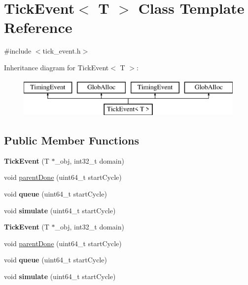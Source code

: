 \hypertarget{classTickEvent}{\section{Tick\-Event$<$ T $>$ Class Template Reference}
\label{classTickEvent}
}


{\ttfamily \#include $<$tick\-\_\-event.\-h$>$}

Inheritance diagram for Tick\-Event$<$ T $>$\-:\begin{figure}[H]
\begin{center}
\leavevmode
\includegraphics[height=2.000000cm]{classTickEvent}
\end{center}
\end{figure}
\subsection*{Public Member Functions}
\begin{DoxyCompactItemize}
\item 
\hypertarget{classTickEvent_ab6621bb33df2dd1e13cb3af454c60414}{{\bfseries Tick\-Event} (T $\ast$\-\_\-obj, int32\-\_\-t domain)}\label{classTickEvent_ab6621bb33df2dd1e13cb3af454c60414}

\item 
void \hyperlink{classTickEvent_ab044a76691e38747e8a1a4106910fcab}{parent\-Done} (uint64\-\_\-t start\-Cycle)
\item 
\hypertarget{classTickEvent_a0adf11e849f6ea0a173d317ea3b60945}{void {\bfseries queue} (uint64\-\_\-t start\-Cycle)}\label{classTickEvent_a0adf11e849f6ea0a173d317ea3b60945}

\item 
\hypertarget{classTickEvent_abc514f421a56a13407269b6ecef4396b}{void {\bfseries simulate} (uint64\-\_\-t start\-Cycle)}\label{classTickEvent_abc514f421a56a13407269b6ecef4396b}

\item 
\hypertarget{classTickEvent_ab6621bb33df2dd1e13cb3af454c60414}{{\bfseries Tick\-Event} (T $\ast$\-\_\-obj, int32\-\_\-t domain)}\label{classTickEvent_ab6621bb33df2dd1e13cb3af454c60414}

\item 
void \hyperlink{classTickEvent_ab044a76691e38747e8a1a4106910fcab}{parent\-Done} (uint64\-\_\-t start\-Cycle)
\item 
\hypertarget{classTickEvent_a0adf11e849f6ea0a173d317ea3b60945}{void {\bfseries queue} (uint64\-\_\-t start\-Cycle)}\label{classTickEvent_a0adf11e849f6ea0a173d317ea3b60945}

\item 
\hypertarget{classTickEvent_abc514f421a56a13407269b6ecef4396b}{void {\bfseries simulate} (uint64\-\_\-t start\-Cycle)}\label{classTickEvent_abc514f421a56a13407269b6ecef4396b}

\end{DoxyCompactItemize}
